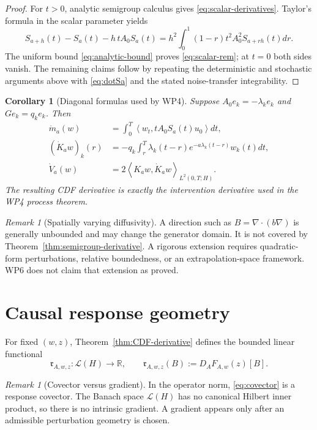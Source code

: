\documentclass[11pt]{article}
\newtheorem{corollary}[assumption]{Corollary}
\theoremstyle{remark}
\newtheorem{remark}[assumption]{Remark}
\newcommand{\R}{\mathbb R}
\newcommand{\cL}{\mathcal L}
\newcommand{\ip}[2]{\left\langle #1,#2\right\rangle}
\begin{document}
\begin{proof}
For $t>0$, analytic semigroup calculus gives \eqref{eq:scalar-derivatives}. Taylor's formula in the scalar parameter yields
\[
 S_{a+h}(t)-S_a(t)-h\,tA_0S_a(t)
 =h^2\int_0^1(1-r)t^2A_0^2S_{a+rh}(t)dr.
\]
The uniform bound \eqref{eq:analytic-bound} proves \eqref{eq:scalar-rem}; at $t=0$ both sides vanish. The remaining claims follow by repeating the deterministic and stochastic arguments above with \eqref{eq:dotSa} and the stated noise-transfer integrability.
\end{proof}

\begin{corollary}[Diagonal formulas used by WP4]\label{cor:diagonal}
Suppose $A_0e_k=-\lambda_ke_k$ and $G e_k=q_ke_k$. Then
\begin{align}
 \dot m_a(w)
 &=\int_0^T\ip{w_t}{tA_0S_a(t)u_0}dt,
 \label{eq:dotm-diag}\\
 (\dot K_aw)_k(r)
 &=-q_k\int_r^T\lambda_k(t-r)e^{-a\lambda_k(t-r)}w_k(t)dt,
 \label{eq:dotK-diag}\\
 \dot V_a(w)
 &=2\ip{K_aw}{\dot K_aw}_{L^2(0,T;H)}.
 \label{eq:dotV-diag}
\end{align}
The resulting CDF derivative is exactly the intervention derivative used in the WP4 process theorem.
\end{corollary}

\begin{remark}[Spatially varying diffusivity]
A direction such as $B=\nabla\!\cdot(b\nabla)$ is generally unbounded and may change the generator domain. It is not covered by Theorem~\ref{thm:semigroup-derivative}. A rigorous extension requires quadratic-form perturbations, relative boundedness, or an extrapolation-space framework. WP6 does not claim that extension as proved.
\end{remark}

\section{Causal response geometry}

For fixed $(w,z)$, Theorem~\ref{thm:CDF-derivative} defines the bounded linear functional
\begin{equation}\label{eq:covector}
 \mathfrak r_{A,w,z}:\cL(H)\to\R,
 \qquad
 \mathfrak r_{A,w,z}(B):=D_AF_{A,w}(z)[B].
\end{equation}

\begin{remark}[Covector versus gradient]
In the operator norm, \eqref{eq:covector} is a response covector. The Banach space $\cL(H)$ has no canonical Hilbert inner product, so there is no intrinsic gradient. A gradient appears only after an admissible perturbation geometry is chosen.
\end{remark}
\end{document}
